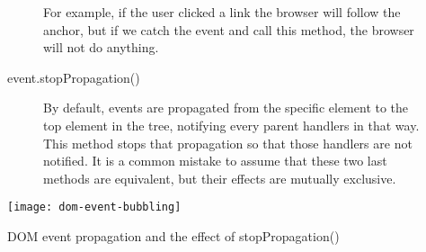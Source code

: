 \begin{description}
\begin{description}
    For example, if the user clicked a link the browser will follow the anchor, but if we catch the event and call this method, the browser will not do anything.
    \item[event.stopPropagation()] By default, events are propagated from the specific element to the top element in the  tree, notifying every parent handlers in that way.
    This method stops that propagation so that those handlers are not notified.
    It is a common mistake to assume that these two last methods are equivalent, but their effects are mutually exclusive.
  \end{description}
\end{description}

\begin{figure}[htbp]
  \centering
    \texttt{[image: dom-event-bubbling]}
  \caption[DOM event propagation]{DOM event propagation and the effect of stopPropagation()}
  \label{fig:dom-event}
\end{figure}


